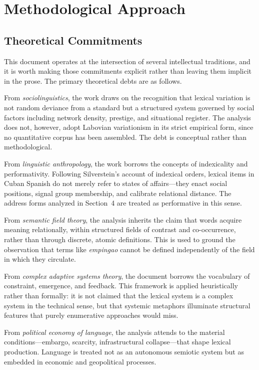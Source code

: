 \documentclass[12pt]{article}
\begin{document}
\section{Methodological Approach}

\subsection*{Theoretical Commitments}

This document operates at the intersection of several intellectual traditions, and it is worth making those commitments explicit rather than leaving them implicit in the prose. The primary theoretical debts are as follows.

From \textit{sociolinguistics}, the work draws on the recognition that lexical variation is not random deviance from a standard but a structured system governed by social factors including network density, prestige, and situational register. The analysis does not, however, adopt Labovian variationism in its strict empirical form, since no quantitative corpus has been assembled. The debt is conceptual rather than methodological.

From \textit{linguistic anthropology}, the work borrows the concepts of indexicality and performativity. Following Silverstein's account of indexical orders, lexical items in Cuban Spanish do not merely refer to states of affairs---they enact social positions, signal group membership, and calibrate relational distance. The address forms analyzed in Section~4 are treated as performative in this sense.

From \textit{semantic field theory}, the analysis inherits the claim that words acquire meaning relationally, within structured fields of contrast and co-occurrence, rather than through discrete, atomic definitions. This is used to ground the observation that terms like \textit{empingao} cannot be defined independently of the field in which they circulate.

From \textit{complex adaptive systems theory}, the document borrows the vocabulary of constraint, emergence, and feedback. This framework is applied heuristically rather than formally: it is not claimed that the lexical system is a complex system in the technical sense, but that systemic metaphors illuminate structural features that purely enumerative approaches would miss.

From \textit{political economy of language}, the analysis attends to the material conditions---embargo, scarcity, infrastructural collapse---that shape lexical production. Language is treated not as an autonomous semiotic system but as embedded in economic and geopolitical processes.
\end{document}
